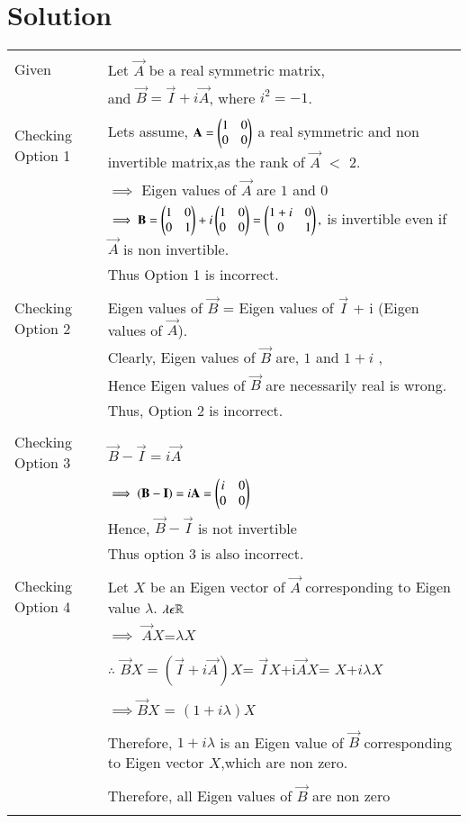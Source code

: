 \documentclass[journal,12pt,twocolumn]{IEEEtran}
\begin{document}
\section{\textbf{Solution}}
\begin{table}[h!]
\begin{center}
\begin{tabular}{|p{5cm}|p{10cm}|}
\hline
& \\
Given &Let $\vec{A}$ be a real symmetric matrix,
\\& and $\vec{B}=\vec{I}+i\vec{A}$, where $i^2=-1$.\\
\hline
&\\
Checking Option 1
& Lets assume, $\mathbf{A}=\begin{pmatrix}1 & 0\\ 0 & 0\end{pmatrix}$ a real symmetric and non invertible matrix,as the rank of $\vec{A}$ $<$ $2.$\\& $\implies$ Eigen values of $\vec{A}$ are $1$ and $0$ \\&$\implies\mathbf{B}=\begin{pmatrix}1 & 0\\ 0 & 1\end{pmatrix}+i\begin{pmatrix}1 & 0\\ 0 & 0\end{pmatrix}=\begin{pmatrix}1+i & 0\\ 0 & 1  \end{pmatrix},$ is invertible even if $\vec{A}$ is non invertible.\\&Thus Option 1 is incorrect.  \\
\hline
&\\
Checking Option 2 
& Eigen values of $\vec{B}$ = Eigen values of  $\vec{I}$ + i (Eigen values of $\vec{A}$).\\& Clearly, Eigen values of $\vec{B}$ are, $1$ and $1+i$  ,\\& Hence Eigen values of $\vec{B}$ are necessarily real is wrong.\\&
Thus, Option 2 is incorrect.\\
\hline
 &\\
Checking Option 3
& $\vec{B}-\vec{I}=i\vec{A}$\\
&$\implies \mathbf{(B-I)}=i\mathbf{A}=\begin{pmatrix}i & 0\\ 0 & 0\end{pmatrix}$\\
& Hence, $\vec{B}-\vec{I}$ is not invertible \\& Thus option 3 is also incorrect.\\
\hline
& \\
Checking Option 4 & Let $X$ be an Eigen vector of $\vec{A}$ corresponding to Eigen value $\lambda$. $\lambda\epsilon \mathbb{R}$\\
& $\implies$ $\vec{A}$$X$=$\lambda X $ \\
&\\
& $\therefore$ $\vec{B}$$X=(\vec{I}+i\vec{A})X$= $\vec{I}$$X$+i$\vec{A}$$X$= $X$+$i\lambda$$X$\\
&\\
& $\implies$$\vec{B}$$X$ = $(1+i\lambda)$$X$\\
&\\
& Therefore, $1+i\lambda$ is an Eigen value of $\vec{B}$ corresponding to Eigen vector $X$,which are non zero.\\
&\\
& Therefore, all Eigen values of $\vec{B}$ are non zero \\
&\\


\end{tabular}
\end{center}
\end{table}
\end{document}
